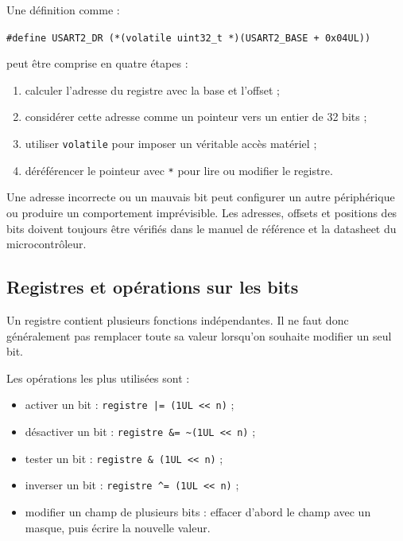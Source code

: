 \documentclass[11pt,a4paper]{article}
\begin{document}
	Une définition comme :
	
	\begin{center}
		\texttt{\#define USART2\_DR (*(volatile uint32\_t *)(USART2\_BASE + 0x04UL))}
	\end{center}
	
	peut être comprise en quatre étapes :
	
	\begin{enumerate}
		\item calculer l'adresse du registre avec la base et l'offset ;
		\item considérer cette adresse comme un pointeur vers un entier de 32 bits ;
		\item utiliser \texttt{volatile} pour imposer un véritable accès matériel ;
		\item déréférencer le pointeur avec \texttt{*} pour lire ou modifier le registre.
	\end{enumerate}
	
	\begin{warningbox}
		Une adresse incorrecte ou un mauvais bit peut configurer un autre périphérique ou produire un comportement imprévisible. Les adresses, offsets et positions des bits doivent toujours être vérifiés dans le manuel de référence et la datasheet du microcontrôleur.
	\end{warningbox}
	
	\subsection*{Registres et opérations sur les bits}
	
	Un registre contient plusieurs fonctions indépendantes. Il ne faut donc généralement pas remplacer toute sa valeur lorsqu'on souhaite modifier un seul bit.
	
	Les opérations les plus utilisées sont :
	
	\begin{itemize}
		\item activer un bit : \verb!registre |= (1UL << n)! ;
		\item désactiver un bit : \verb!registre &= ~(1UL << n)! ;
		\item tester un bit : \verb!registre & (1UL << n)! ;
		\item inverser un bit : \verb!registre ^= (1UL << n)! ;
		\item modifier un champ de plusieurs bits : effacer d'abord le champ avec un masque, puis écrire la nouvelle valeur.
	\end{itemize}
	
\end{document}
